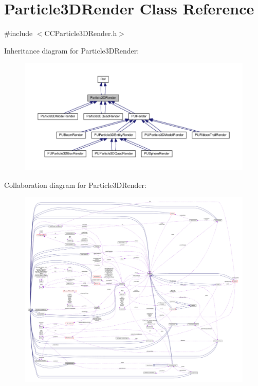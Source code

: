 \hypertarget{classParticle3DRender}{}\section{Particle3\+D\+Render Class Reference}
\label{classParticle3DRender}


{\ttfamily \#include $<$C\+C\+Particle3\+D\+Render.\+h$>$}



Inheritance diagram for Particle3\+D\+Render\+:
\nopagebreak
\begin{figure}[H]
\begin{center}
\leavevmode
\includegraphics[width=350pt]{classParticle3DRender__inherit__graph}
\end{center}
\end{figure}


Collaboration diagram for Particle3\+D\+Render\+:
\nopagebreak
\begin{figure}[H]
\begin{center}
\leavevmode
\includegraphics[width=350pt]{classParticle3DRender__coll__graph}
\end{center}
\end{figure}
